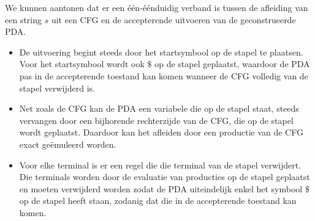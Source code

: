   We kunnen aantonen dat er een \'e\'en-\'e\'enduidig verband is tussen de afleiding van een string $s$ uit een CFG en de accepterende uitvoeren van de geconstrueerde PDA.
  \begin{itemize}
  \item De uitvoering begint steeds door het startsymbool op de stapel te plaatsen. Voor het startsymbool wordt ook $\$$ op de stapel geplaatst, waardoor de PDA pas in de accepterende toestand kan komen wanneer de CFG volledig van de stapel verwijderd is.
  \item Net zoals de CFG kan de PDA een variabele die op de stapel staat, steeds vervangen door een bijhorende rechterzijde van de CFG, die op de stapel wordt geplaatst. Daardoor kan het afleiden door een productie van de CFG exact ge\"emuleerd worden.
  \item Voor elke terminal is er een regel die die terminal van de stapel verwijdert. Die terminals worden door de evaluatie van producties op de stapel geplaatst en moeten verwijderd worden zodat de PDA uiteindelijk enkel het symbool $\$$ op de stapel heeft staan, zodanig dat die in de accepterende toestand kan komen.
  \end{itemize}